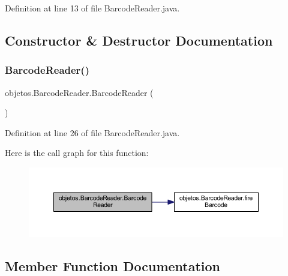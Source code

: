 Definition at line 13 of file Barcode\+Reader.\+java.



\subsection{Constructor \& Destructor Documentation}
\mbox{\label{classobjetos_1_1_barcode_reader_a0dc943983b8313727f52c7e043805a80}} 
\subsubsection{\texorpdfstring{Barcode\+Reader()}{BarcodeReader()}}
{\footnotesize\ttfamily objetos.\+Barcode\+Reader.\+Barcode\+Reader (\begin{DoxyParamCaption}{ }\end{DoxyParamCaption})}



Definition at line 26 of file Barcode\+Reader.\+java.

Here is the call graph for this function\+:\nopagebreak
\begin{figure}[H]
\begin{center}
\leavevmode
\includegraphics[width=350pt]{classobjetos_1_1_barcode_reader_a0dc943983b8313727f52c7e043805a80_cgraph}
\end{center}
\end{figure}


\subsection{Member Function Documentation}
\mbox{\label{classobjetos_1_1_barcode_reader_a7c0a8f3e684c72a78005c97f3d9cdc24}} 
